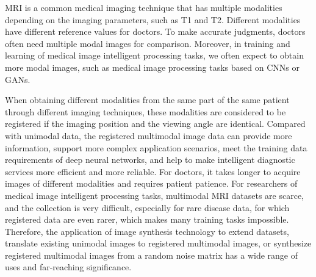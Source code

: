 \documentclass{ecai}
\begin{document}
MRI is a common medical imaging technique that has multiple modalities depending on the imaging parameters, such as T1 and T2. Different modalities have different reference values for doctors. To make accurate judgments, doctors often need multiple modal images for comparison. Moreover, in training and learning of medical image intelligent processing tasks, we often expect to obtain more modal images, such as medical image processing tasks based on CNNs\cite{86krizhevsky2012imagenet} or GANs\cite{25goodfellow2014generative}. 

When obtaining different modalities from the same part of the same patient through different imaging techniques, these modalities are considered to be registered if the imaging position and the viewing angle are identical. Compared with unimodal data, the registered multimodal image data can provide more information, support more complex application scenarios, meet the training data requirements of deep neural networks, and help to make intelligent diagnostic services more efficient and more reliable. For doctors, it takes longer to acquire images of different modalities and requires patient patience. For researchers of medical image intelligent processing tasks, multimodal MRI datasets are scarce, and the collection is very difficult, especially for rare disease data, for which registered data are even rarer, which makes many training tasks impossible. Therefore, the application of image synthesis technology to extend datasets, translate existing unimodal images to registered multimodal images, or synthesize registered multimodal images from a random noise matrix has a wide range of uses and far-reaching significance.
\end{document}
